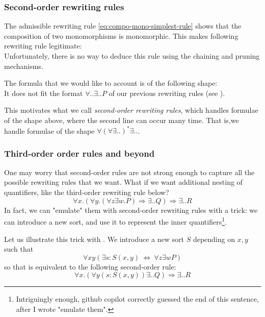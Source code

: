 \documentclass{article}
\begin{document}
\subsubsection{Second-order rewriting rules}
The admissible rewriting rule \eqref{eq:compo-mono-simplest-rule} shows that the composition of two monomorphisms is monomorphic.
This makes following rewriting rule legitimate:
\[

\]
Unfortunately, there is no way to deduce this rule using the chaining and pruning mechanisms.

The formula that we would like to account is of the following shape:
\[

\] 
It does not fit the format $∀ .. ∃ .. P$ of our previous rewriting rules (see ).

This motivates what we call \emph{second-order rewriting rules}, which handles formulae of the shape above, where 
the second line can occur many time. That is,we handle formulae of the shape $∀ (∀ ∃ .. )^* ∃ .. $.
    \subsubsection{Third-order order rules and beyond}
One may worry that second-order rules are not strong enough to capture all the possible rewriting rules that we want. What if we want additional nesting of quantifiers, like the third-order rewriting rule below?
\begin{equation}
    \label{eq:third-order}
∀ x. \left(∀y. (∀z ∃ w.P) ⇒ ∃..Q  \right) 
⇒ ∃.. R 
\end{equation}
In fact, we can "emulate" them with second-order rewriting rules with a trick: we can introduce a new sort, and use it to represent the inner quantifiers\footnote{Intriguingly enough, github copilot correctly guessed the end of this sentence, after I wrote "emulate them".}. 

Let us illustrate this trick with .
We introduce a new sort $S$ depending on $x,y$ such that
\begin{equation}
    \label{eq:sort-equivalence}
∀ xy\left(∃ s:S(x,y)\   ⇔ \ 
∀ z ∃ w P\right) 
\end{equation}
so that  is equivalent to the following second-order rule:
\[
    ∀ x. \left(∀y(s:S(x,y)) ∃..Q  \right) ⇒ ∃.. R
\]
\end{document}
